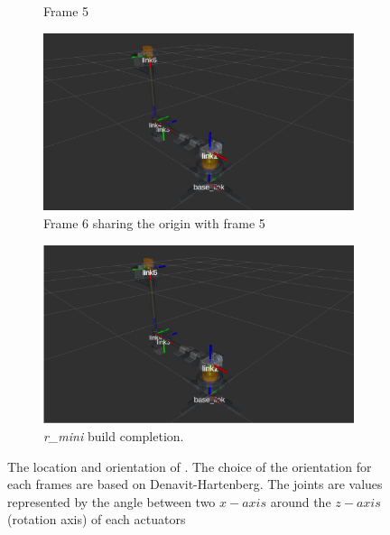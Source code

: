 \begin{figure}[h!]
\begin{subfigure}[t]{0.2\linewidth}
    \caption{Frame 5}
  \end{subfigure}
  \begin{subfigure}[t]{0.2\linewidth}
    \includegraphics[width=\linewidth]{r_mini_frame6.png}
    \caption{Frame 6 sharing the origin with frame 5}
  \end{subfigure}
  \begin{subfigure}[b]{0.4\linewidth}
    \includegraphics[width=\linewidth]{r_mini_local_frames.png}
    \caption{\textit{r\_mini} build completion.}
  \end{subfigure}

\caption{The location and orientation of \rimini. The choice of the orientation for each frames are based on Denavit-Hartenberg.
          The joints are values represented by the angle between two $x-axis$ around the $z-axis$ (rotation axis) of each actuators }
  \label{fig:rimini_joints}
\end{figure}
